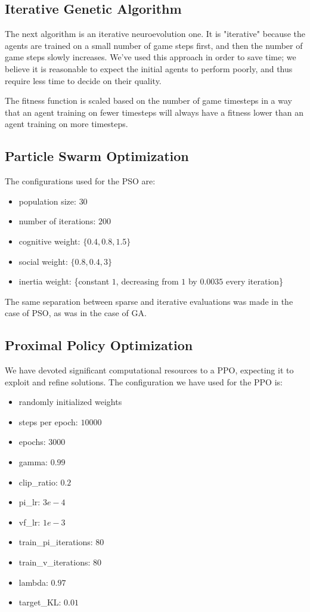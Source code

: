 \documentclass[conference]{IEEEtran}
\begin{document}
    \subsection{Iterative Genetic Algorithm}
    The next algorithm is an iterative neuroevolution one.
    It is "iterative" because the agents are trained on a small number of game steps
    first, and then the number of game steps slowly increases. We've used this approach in order to save time; we believe it is reasonable to expect the initial agents to perform poorly, and thus require less time to decide on their quality.

    The fitness function is scaled based on the number of game timesteps in a way that an agent
    training on fewer timesteps will always have a fitness lower than an agent training on more timesteps.

    \subsection{Particle Swarm Optimization}\label{subsec:searching-neural-network-weights-with-particle-swarm-optimization}
    The configurations used for the PSO are:
    \begin{itemize}
        \item population size: $30$
        \item number of iterations: $200$
        \item cognitive weight: $\{0.4, 0.8, 1.5\}$
        \item social weight: $\{0.8, 0.4, 3\}$
        \item inertia weight: \{constant $1$, decreasing from $1$ by $0.0035$ every iteration\}
    \end{itemize}
    The same separation between sparse and iterative evaluations was made in the case
    of PSO, as was in the case of GA.

    \subsection{Proximal Policy Optimization}\label{subsec:proximal-policy-optimization}
    We have devoted significant computational resources to a PPO\cite{ppo}, expecting it to exploit and refine solutions.
    The configuration we have used for the PPO is:
    \begin{itemize}
        \item randomly initialized weights
        \item steps per epoch: $10000$
        \item epochs: $3000$
        \item gamma: $0.99$
        \item clip\_ratio: $0.2$
        \item pi\_lr: $3e-4$
        \item vf\_lr: $1e-3$
        \item train\_pi\_iterations: $80$
        \item train\_v\_iterations: $80$
        \item lambda: $0.97$
        \item target\_KL: $0.01$
    \end{itemize}
\end{document}
